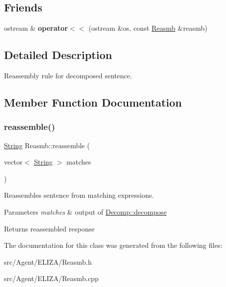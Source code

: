 \subsection*{Friends}
\begin{DoxyCompactItemize}
\item 
\mbox{\label{classReasmb_a705525beb8fb25cb1d4b9ba89b055e67}} 
ostream \& {\bfseries operator$<$$<$} (ostream \&os, const \mbox{\hyperlink{classReasmb}{Reasmb}} \&reasmb)
\end{DoxyCompactItemize}


\subsection{Detailed Description}
Reassembly rule for decomposed sentence. 

\subsection{Member Function Documentation}
\mbox{\label{classReasmb_abba1a0d8940231ac3e9ce7fd39173eb4}} 
\subsubsection{\texorpdfstring{reassemble()}{reassemble()}}
{\footnotesize\ttfamily \mbox{\hyperlink{classString}{String}} Reasmb\+::reassemble (\begin{DoxyParamCaption}\item[{vector$<$ \mbox{\hyperlink{classString}{String}} $>$}]{matches }\end{DoxyParamCaption})}

Reassembles sentence from matching expressions. 
\begin{DoxyParams}{Parameters}
{\em matches} & output of \mbox{\hyperlink{classDecomp_a5778e75423e33df37fe2e41157d3bc03}{Decomp\+::decompose}} \\
\hline
\end{DoxyParams}
\begin{DoxyReturn}{Returns}
reassembled response 
\end{DoxyReturn}


The documentation for this class was generated from the following files\+:\begin{DoxyCompactItemize}
\item 
src/\+Agent/\+E\+L\+I\+Z\+A/Reasmb.\+h\item 
src/\+Agent/\+E\+L\+I\+Z\+A/Reasmb.\+cpp\end{DoxyCompactItemize}
